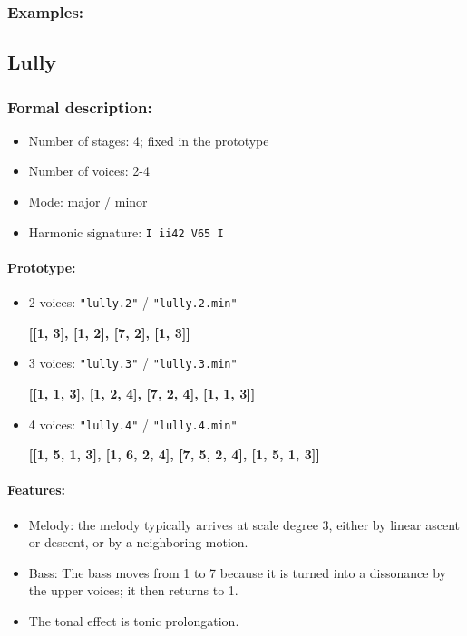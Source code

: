 ﻿\documentclass[11pt, openany]{article}
\begin{document}
\begin{itemize}
\subsubsection{Examples:}


	\subsection{Lully}
	
\subsubsection{Formal description:}
\begin{itemize}
\item Number of stages: 4; fixed in the prototype
\item Number of voices: 2-4
\item Mode: major / minor
\item Harmonic signature: \texttt{I ii42 V65 I}
\end{itemize}

\paragraph{Prototype:}
\begin{itemize}
\item 2 voices: \texttt{"lully.2"} / \texttt{"lully.2.min"}
	\begin{center}
	\textbf{[[1, 3], [1, 2], [7, 2], [1, 3]]}
	\end{center}
\item 3 voices: \texttt{"lully.3"} / \texttt{"lully.3.min"}
	\begin{center}
	\textbf{[[1, 1, 3], [1, 2, 4], [7, 2, 4], [1, 1, 3]]}
	\end{center}
\item 4 voices: \texttt{"lully.4"} / \texttt{"lully.4.min"}
	\begin{center}
	\textbf{[[1, 5, 1, 3], [1, 6, 2, 4], [7, 5, 2, 4], [1, 5, 1, 3]]}
	\end{center}
\end{itemize}

\paragraph{Features:}
\begin{itemize}
\item Melody: the melody typically arrives at scale degree 3, either by linear ascent or descent, or by a neighboring motion.
\item Bass: The bass moves from 1 to 7 because it is turned into a dissonance by the upper voices; it then returns to 1.
\item The tonal effect is tonic prolongation.


\end{itemize}
\end{itemize}
\end{document}
